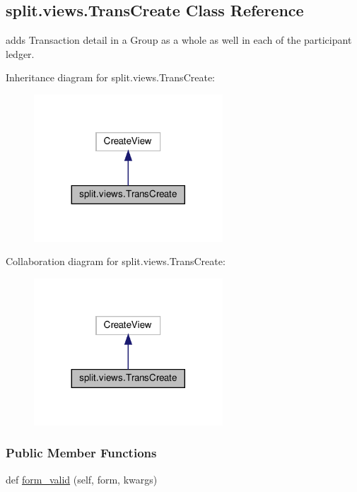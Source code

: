 \hypertarget{classsplit_1_1views_1_1TransCreate}{}\subsection{split.\+views.\+Trans\+Create Class Reference}
\label{classsplit_1_1views_1_1TransCreate}


adds Transaction detail in a Group as a whole as well in each of the participant ledger.  




Inheritance diagram for split.\+views.\+Trans\+Create\+:\nopagebreak
\begin{figure}[H]
\begin{center}
\leavevmode
\includegraphics[width=200pt]{classsplit_1_1views_1_1TransCreate__inherit__graph}
\end{center}
\end{figure}


Collaboration diagram for split.\+views.\+Trans\+Create\+:\nopagebreak
\begin{figure}[H]
\begin{center}
\leavevmode
\includegraphics[width=200pt]{classsplit_1_1views_1_1TransCreate__coll__graph}
\end{center}
\end{figure}
\subsubsection*{Public Member Functions}
\begin{DoxyCompactItemize}
\item 
def \hyperlink{classsplit_1_1views_1_1TransCreate_ad192972eafc095c971f6df984fcec0fa}{form\+\_\+valid} (self, form, kwargs)
\end{DoxyCompactItemize}
